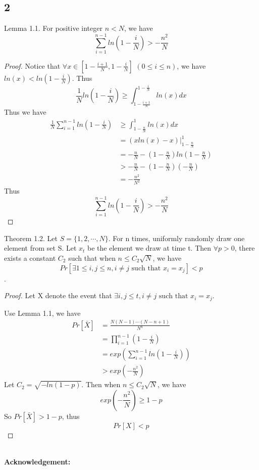 \documentclass{article}
\newcommand{\Acknowledgement}[1]{\ \\{\bf Acknowledgement:} #1}
\begin{document}
\begin{spacing}{1.1}
    \subsection*{2}
    Lemma 1.1. For positive integer $n < N$, we have
    $$\sum_{i=1}^{n-1}ln(1 - \frac{i}{N}) >-\frac{n^2}{N}$$
    \begin{proof}
        Notice that $\forall x\in [1 -\frac{i+1}{N}, 1 - \frac{i}{N}]$ $(0\leq i\leq n)$, we have $ln(x) < ln(1 - \frac{i}{N})$. Thus
        $$\frac{1}{N}ln(1 - \frac{i}{N}) \geq \int_{1 - \frac{i+1}{N}}^{1 - \frac{i}{N}}ln(x)dx$$
        Thus we have
        \begin{equation}
            \begin{aligned}
                \frac{1}{N}\sum_{i=1}^{n-1}ln(1 - \frac{i}{N}) &\geq \int_{1-\frac{n}{N}}^1 ln(x)dx\\
                &= (xln(x) - x)|_{1-\frac{n}{N}}^1\\
                &= -\frac{n}{N} - (1 - \frac{n}{N})ln(1 - \frac{n}{N})\\
                &> -\frac{n}{N} - (1 - \frac{n}{N})(-\frac{n}{N})\\
                &= - \frac{n^2}{N^2}
            \end{aligned}
        \end{equation}
        Thus
        $$\sum_{i=1}^{n-1}ln(1 - \frac{i}{N}) > -\frac{n^2}{N}$$
    \end{proof}
    Theorem 1.2. Let $S = \{1, 2, \cdots, N\}$. For n times, uniformly randomly draw one element from set S. Let $x_t$ be the element we draw at time t. Then $\forall p > 0$, there exists a constant $C_2$ such that when $n \leq C_2 \sqrt{N}$, we have
    $$Pr[\exists 1\leq i, j \leq n, i\not = j \text{ such that } x_i = x_j] < p$$.
    \begin{proof}
        Let X denote the event that $\exists i, j \leq t, i\not = j \text{ such that } x_i = x_j$.

        Use Lemma 1.1, we have
        \begin{equation}
            \begin{aligned}
                Pr[\bar{X}] &= \frac{N(N-1)\cdots (N-n+1)}{N^n}\\
                &= \prod_{i=1}^{n-1}(1 - \frac{i}{N})\\
                &= exp(\sum_{i=1}^{n-1}ln(1 - \frac{i}{N}))\\
                &> exp(-\frac{n^2}{N})
            \end{aligned}
        \end{equation}
        Let $C_2 = \sqrt{-ln(1-p)}$. Then when $n \leq C_2\sqrt{N}$, we have
        $$exp(-\frac{n^2}{N}) \geq 1 - p$$
        So $Pr[\bar{X}] > 1 - p$, thus
        $$Pr[X] < p$$
    \end{proof}
    \Acknowledgement{}
    
    
    \end{spacing}
    
\end{document}
